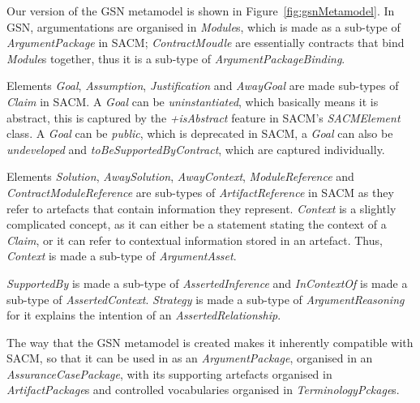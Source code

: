 Our version of the GSN metamodel is shown in Figure~\ref{fig:gsnMetamodel}. 
In GSN, argumentations are organised in \textit{Module}s, which is made as a sub-type of \textit{ArgumentPackage} in SACM; \textit{ContractMoudle} are essentially contracts that bind \textit{Module}s together, thus it is a sub-type of \textit{ArgumentPackageBinding}. 

Elements \textit{Goal}, \textit{Assumption}, \textit{Justification} and \textit{AwayGoal} are made sub-types of \textit{Claim} in SACM. 
A \textit{Goal} can be \textit{uninstantiated}, which basically means it is abstract, this is captured by the \textit{+isAbstract} feature in SACM's \textit{SACMElement} class. 
A \textit{Goal} can be \textit{public}, which is deprecated in SACM, a \textit{Goal} can also be \textit{undeveloped} and \textit{toBeSupportedByContract}, which are captured individually. 

Elements \textit{Solution}, \textit{AwaySolution}, \textit{AwayContext}, \textit{ModuleReference} and \textit{ContractModuleReference} are sub-types of \textit{ArtifactReference} in SACM as they refer to artefacts that contain information they represent. 
\textit{Context} is a slightly complicated concept, as it can either be a statement stating the context of a \textit{Claim}, or it can refer to contextual information stored in an artefact. 
Thus, \textit{Context} is made a sub-type of \textit{ArgumentAsset}. 

\textit{SupportedBy} is made a sub-type of \textit{AssertedInference} and \textit{InContextOf} is made a sub-type of \textit{AssertedContext}. 
\textit{Strategy} is made a sub-type of \textit{ArgumentReasoning} for it explains the intention of an \textit{AssertedRelationship}.

The way that the GSN metamodel is created makes it inherently compatible with SACM, so that it can be used in as an \textit{ArgumentPackage}, organised in an \textit{AssuranceCasePackage}, with its supporting artefacts organised in \textit{ArtifactPackage}s and controlled vocabularies organised in \textit{TerminologyPckage}s. 

